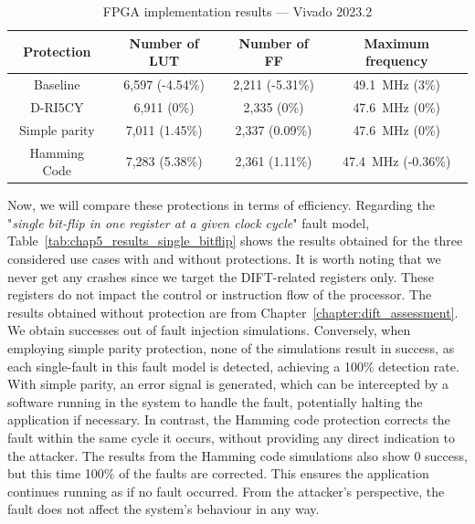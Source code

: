 \begin{table}[t]
    \footnotesize
    \centering
    \caption{FPGA implementation results — Vivado 2023.2}
    \label{tab:chap5_implementation}
    \setlength{\tabcolsep}{3pt}
    \begin{tabular}{@{}c|ccc@{}}
        \toprule
        Protection    & Number of LUT   & Number of FF    & Maximum frequency                \\ \midrule
        Baseline      & 6,597 (-4.54\%) & 2,211 (-5.31\%) & \SI{49.1}{\mega\hertz} (3\%)     \\
        D-RI5CY       & 6,911 (0\%)     & 2,335 (0\%)     & \SI{47.6}{\mega\hertz} (0\%)     \\
        Simple parity & 7,011 (1.45\%)  & 2,337 (0.09\%)  & \SI{47.6}{\mega\hertz} (0\%)     \\
        Hamming Code  & 7,283 (5.38\%)  & 2,361 (1.11\%)  & \SI{47.4}{\mega\hertz} (-0.36\%) \\
        \bottomrule
    \end{tabular}
\end{table}

Now, we will compare these protections in terms of efficiency.
Regarding the "\textit{single bit-flip in one register at a given clock cycle}" fault model, Table~\ref{tab:chap5_results_single_bitflip} shows the results obtained for the three considered use cases with and without protections. It is worth noting that we never get any crashes since we target the DIFT-related registers only. These registers do not impact the control or instruction flow of the processor.
The results obtained without protection are from Chapter~\ref{chapter:dift_assessment}. We obtain  successes out of  fault injection simulations.
Conversely, when employing simple parity protection, none of the  simulations result in success, as each single-fault in this fault model is detected, achieving a 100\% detection rate. With simple parity, an error signal is generated, which can be intercepted by a software running in the system to handle the fault, potentially halting the application if necessary. In contrast, the Hamming code protection corrects the fault within the same cycle it occurs, without providing any direct indication to the attacker. The results from the Hamming code simulations also show 0 success, but this time 100\% of the faults are corrected. This ensures the application continues running as if no fault occurred. From the attacker’s perspective, the fault does not affect the system’s behaviour in any way.

